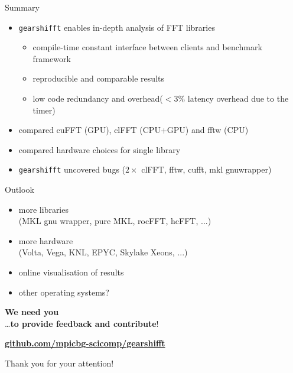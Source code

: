 \documentclass[t,11pt,hyperref={
  pdftitle = {gearshifft},
  pdfsubject = {gearshifft},
  pdfborder={0 0 0},
  colorlinks=true,
  urlcolor=red,
  citecolor=red,
  linkcolor=red,
  pdfauthor={Peter Steinbach, Matthias Werner}
  }
]{beamer}
\def\resetbeamertemplate{\setbeamertemplate{background canvas}{ }}
\newcommand{\gearshifft}{\texttt{gearshifft}}
\begin{document}

\begin{frame}{Summary}{}

\vfill  
  \begin{itemize}
  \item \gearshifft{} enables in-depth analysis of FFT libraries
    \begin{itemize}
    \item compile-time constant interface between clients and benchmark framework
    \item reproducible and comparable results
    \item low code redundancy and overhead\newline ($<3\%$ latency overhead due to the timer)
    \end{itemize}
\pause
\vfill
  \item compared cuFFT (GPU), clFFT (CPU+GPU) and fftw (CPU)
  \item compared hardware choices for single library
  \item \gearshifft{} uncovered bugs ($2\times$ clFFT, fftw, cufft, mkl gnuwrapper)
  \end{itemize}
\vfill
\end{frame}

\begin{frame}{Outlook}{}

\vfill
  \begin{itemize}
  \item more libraries\\
    (MKL gnu wrapper, pure MKL, rocFFT, hcFFT, ...)
  \item more hardware \\
    (Volta, Vega, KNL, EPYC, Skylake Xeons, ...)
  \item online visualisation of results
  \item other operating systems?
  \end{itemize}

\vfill
  \pause \Large
  \textbf{We need you}\\
  \quad\quad \ldots \textbf{to provide feedback and contribute}!\\

\vfill

\begin{center}
  \href{https://github.com/mpicbg-scicomp/gearshifft}{\textbf{github.com/mpicbg-scicomp/gearshifft}}
\end{center}


\vfill
  \pause
 \centering
  Thank you for your attention!
\vfill
\end{frame}
\end{document}
